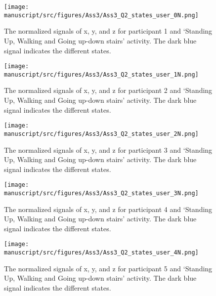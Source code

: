 \begin{figure}[H]
    \centering
    \begin{minipage}[b]{1\textwidth}
        \texttt{[image: manuscript/src/figures/Ass3/Ass3\_Q2\_states\_user\_0N.png]}
    \end{minipage}
    \caption{The normalized signals of x, y, and z for participant 1 and ‘Standing  Up,  Walking  and  Going  up-down  stairs’ activity. The dark blue signal indicates the different states.}
    \label{fig:Ass3_Q2_states_user_0N}
\end{figure}
\begin{figure}[H]
    \centering
    \begin{minipage}[b]{1\textwidth}
        \texttt{[image: manuscript/src/figures/Ass3/Ass3\_Q2\_states\_user\_1N.png]}
    \end{minipage}
    \caption{The normalized signals of x, y, and z for participant 2 and ‘Standing  Up,  Walking  and  Going  up-down  stairs’ activity. The dark blue signal indicates the different states.}
    \label{fig:Ass3_Q2_states_user_1N}
\end{figure}
\begin{figure}[H]
    \centering
    \begin{minipage}[b]{1\textwidth}
        \texttt{[image: manuscript/src/figures/Ass3/Ass3\_Q2\_states\_user\_2N.png]}
    \end{minipage}
    \caption{The normalized signals of x, y, and z for participant 3 and ‘Standing  Up,  Walking  and  Going  up-down  stairs’ activity. The dark blue signal indicates the different states.}
    \label{fig:Ass3_Q2_states_user_2N}
\end{figure}
\begin{figure}[H]
    \centering
    \begin{minipage}[b]{1\textwidth}
        \texttt{[image: manuscript/src/figures/Ass3/Ass3\_Q2\_states\_user\_3N.png]}
    \end{minipage}
    \caption{The normalized signals of x, y, and z for participant 4 and ‘Standing  Up,  Walking  and  Going  up-down  stairs’ activity. The dark blue signal indicates the different states.}
    \label{fig:Ass3_Q2_states_user_3N}
\end{figure}
\begin{figure}[H]
    \centering
    \begin{minipage}[b]{1\textwidth}
        \texttt{[image: manuscript/src/figures/Ass3/Ass3\_Q2\_states\_user\_4N.png]}
    \end{minipage}
    \caption{The normalized signals of x, y, and z for participant 5 and ‘Standing  Up,  Walking  and  Going  up-down  stairs’ activity. The dark blue signal indicates the different states.}
    \label{fig:Ass3_Q2_states_user_4N}
\end{figure}
